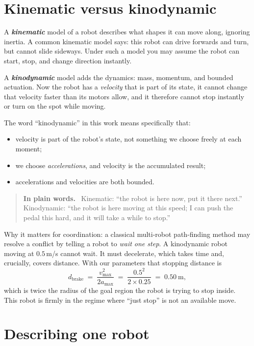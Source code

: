 \documentclass[11pt,a4paper]{article}
\newcommand{\defn}[1]{\textbf{\textit{#1}}}
\newenvironment{keypoint}
  {\begin{quote}\small\noindent\textbf{In plain words.}\ }
  {\end{quote}}
\begin{document}
\section{Kinematic versus kinodynamic}

A \defn{kinematic} model of a robot describes what shapes it can move along, ignoring
inertia. A common kinematic model says: this robot can drive forwards and turn, but cannot
slide sideways. Under such a model you may assume the robot can start, stop, and change
direction instantly.

A \defn{kinodynamic} model adds the dynamics: mass, momentum, and bounded actuation. Now
the robot has a \emph{velocity} that is part of its state, it cannot change that velocity
faster than its motors allow, and it therefore cannot stop instantly or turn on the spot
while moving.

The word ``kinodynamic'' in this work means specifically that:
\begin{itemize}[nosep]
\item velocity is part of the robot's state, not something we choose freely at each moment;
\item we choose \emph{accelerations}, and velocity is the accumulated result;
\item accelerations and velocities are both bounded.
\end{itemize}

\begin{keypoint}
Kinematic: ``the robot is here now, put it there next.'' Kinodynamic: ``the robot is here
moving at this speed; I can push the pedal this hard, and it will take a while to stop.''
\end{keypoint}

Why it matters for coordination: a classical multi-robot path-finding method may resolve a
conflict by telling a robot to \emph{wait one step}. A kinodynamic robot moving at
$0.5$\,m/s cannot wait. It must decelerate, which takes time and, crucially, covers
distance. With our parameters that stopping distance is
\[
d_{\mathrm{brake}} \;=\; \frac{v_{\max}^2}{2 a_{\max}}
\;=\; \frac{0.5^2}{2 \times 0.25} \;=\; 0.50\ \text{m},
\]
which is twice the radius of the goal region the robot is trying to stop inside. This robot
is firmly in the regime where ``just stop'' is not an available move.

\section{Describing one robot}
\end{document}
